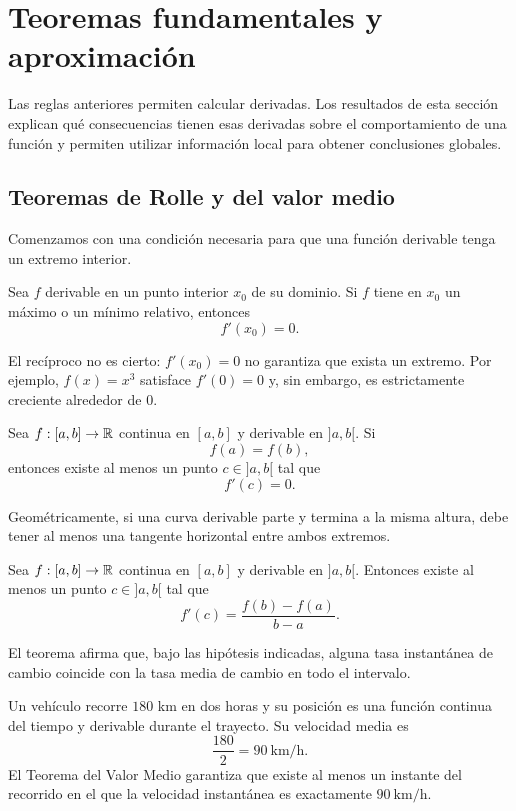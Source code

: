 \section{Teoremas fundamentales y aproximación}
\label{sec:teoremas-aproximacion}

Las reglas anteriores permiten calcular derivadas. Los resultados de esta sección explican qué consecuencias tienen esas derivadas sobre el comportamiento de una función y permiten utilizar información local para obtener conclusiones globales.

\subsection{Teoremas de Rolle y del valor medio}

Comenzamos con una condición necesaria para que una función derivable tenga un extremo interior.

\begin{theorem}
Sea $f$ derivable en un punto interior $x_0$ de su dominio. Si $f$ tiene en $x_0$ un máximo o un mínimo relativo, entonces
\[
f'(x_0)=0.
\]
\end{theorem}

El recíproco no es cierto: $f'(x_0)=0$ no garantiza que exista un extremo. Por ejemplo, $f(x)=x^3$ satisface $f'(0)=0$ y, sin embargo, es estrictamente creciente alrededor de $0$.

\begin{theorem}
Sea $f:[a,b]\to\mathbb{R}$ continua en $[a,b]$ y derivable en $]a,b[$. Si
\[
f(a)=f(b),
\]
entonces existe al menos un punto $c\in]a,b[$ tal que
\[
f'(c)=0.
\]
\end{theorem}

Geométricamente, si una curva derivable parte y termina a la misma altura, debe tener al menos una tangente horizontal entre ambos extremos.

\begin{theorem}
Sea $f:[a,b]\to\mathbb{R}$ continua en $[a,b]$ y derivable en $]a,b[$. Entonces existe al menos un punto $c\in]a,b[$ tal que
\[
f'(c)=\frac{f(b)-f(a)}{b-a}.
\]
\end{theorem}

El teorema afirma que, bajo las hipótesis indicadas, alguna tasa instantánea de cambio coincide con la tasa media de cambio en todo el intervalo.

\begin{example}
Un vehículo recorre $180$ km en dos horas y su posición es una función continua del tiempo y derivable durante el trayecto. Su velocidad media es
\[
\frac{180}{2}=90\ \mathrm{km/h}.
\]
El Teorema del Valor Medio garantiza que existe al menos un instante del recorrido en el que la velocidad instantánea es exactamente $90\ \mathrm{km/h}$.
\end{example}

